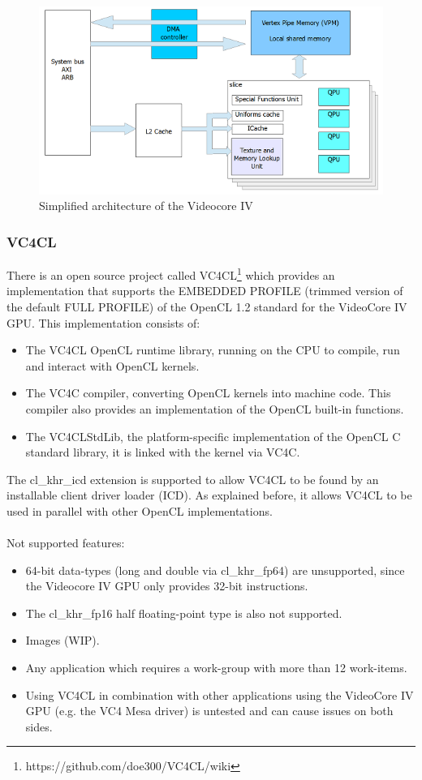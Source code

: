 \documentclass[12pt,a4paper,oneside]{article}
\begin{document}
\begin{figure}[H]
\centering
  \includegraphics[scale=1]{img/vc4_qpu.png}
  \caption{Simplified architecture of the Videocore IV}
  \label{fig:html_output}
\end{figure}

\subsubsection*{VC4CL}
There is an open source project called VC4CL\footnote{https://github.com/doe300/VC4CL/wiki}
which provides an implementation that supports the EMBEDDED PROFILE (trimmed
version of the default FULL PROFILE) of the OpenCL 1.2 standard for the VideoCore
IV GPU. This implementation consists of:
\begin{itemize}
    \item The VC4CL OpenCL runtime library, running on the CPU to compile,
    run and interact with OpenCL kernels.
    \item The VC4C compiler, converting OpenCL kernels into machine code. This
    compiler also provides an implementation of the OpenCL built-in functions.
    \item The VC4CLStdLib, the platform-specific implementation of the OpenCL C
    standard library, it is linked with the kernel via VC4C.
\end{itemize}
The {\selectfont cl\_khr\_icd} extension is supported to allow
VC4CL to be found by an installable client driver loader (ICD). As explained
before, it allows VC4CL to be used in parallel with other OpenCL implementations.
\\\\
Not supported features:
\begin{itemize}
  \item 64-bit data-types (long and double via {\selectfont cl\_khr\_fp64})
  are unsupported, since the Videocore IV GPU only provides 32-bit instructions.
  \item The {\selectfont cl\_khr\_fp16} half floating-point type is
  also not supported.
  \item Images (WIP).
  \item Any application which requires a work-group with more than 12 work-items.
  \item Using VC4CL in combination with other applications using the VideoCore IV
  GPU (e.g. the VC4 Mesa driver) is untested and can cause issues on both sides.
\end{itemize}
\end{document}
